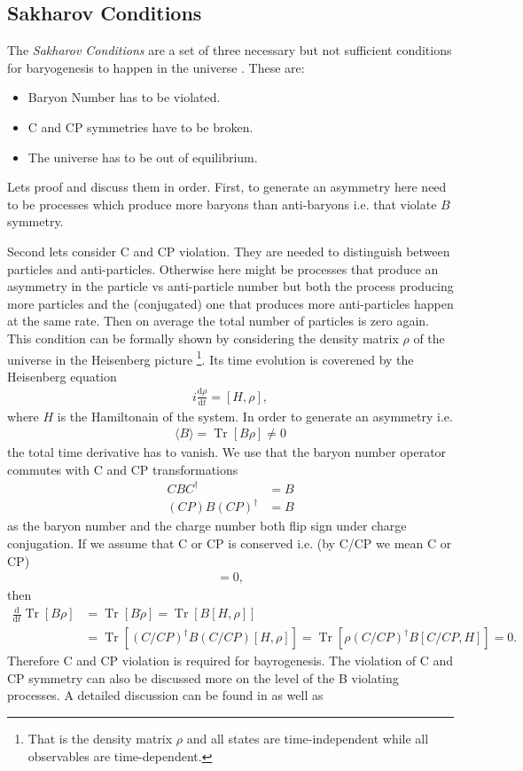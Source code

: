 \documentclass[13pt,a4paper,twoside,titlepage]{article}
\newcommand{\Tr}{\operatorname{Tr}}
\begin{document}
\subsection{Sakharov Conditions}
The \emph{Sakharov Conditions} are a set of three necessary but not sufficient conditions for baryogenesis to happen in the universe \cite{Sakharov_1991}. These are:
\begin{itemize}
    \item Baryon Number has to be violated.
    \item C and CP symmetries have to be broken.
    \item The universe has to be out of equilibrium.
\end{itemize}
Lets proof and discuss them in order.
First, to generate an asymmetry here need to be processes which produce more baryons than anti-baryons i.e. that violate $B$ symmetry.

Second lets consider C and CP violation. They are needed to distinguish between particles and anti-particles. Otherwise here might be processes that produce an asymmetry in the
particle vs anti-particle number but both the process producing more particles and the (conjugated) one that produces more anti-particles happen at the same rate.
Then on average the total number of particles is zero again.
This condition can be formally shown by considering the density matrix $\rho$ of the universe in the Heisenberg picture \footnote{That is the density matrix $\rho$ and all states are time-independent while all observables are time-dependent.}. Its time evolution is coverened by the Heisenberg equation
\begin{align}
    i \frac{\mathrm{d} \rho}{\mathrm{d} t} = [H, \rho],
\end{align}
where $H$ is the Hamiltonain of the system.
In order to generate an asymmetry i.e.
\begin{align}
    \langle B \rangle = \Tr [ B \rho ] \neq 0
\end{align}
the total time derivative has to vanish.
We use that the baryon number operator commutes with C and CP transformations
\begin{align}
    C B C^\dagger &= B \\
    (C P) B (C P)^\dagger &= B
\end{align}
as the baryon number and the charge number both flip sign under charge conjugation.
If we assume that C or CP is conserved i.e. (by C/CP we mean C or CP)
\begin{align}
[H, C/CP] = 0,
\end{align}
then
\begin{align}
    \frac{\mathrm{d}}{\mathrm{d} t} \Tr [ B \rho ] &= \Tr [ B \dot{\rho} ] = \Tr [ B [H, \rho] ] \\
    &= \Tr [ (C/CP)^\dagger B (C/CP) [H, \rho] ] = \Tr [ \rho (C/CP)^\dagger B [C/CP, H] ] = 0.
\end{align}
Therefore C and CP violation is required for bayrogenesis. The violation of C and CP symmetry can also be discussed more on the level of the B violating processes. A detailed discussion can be found in \cite[sec 2.3]{Cline:2006ts_Baryogenesis} as well as %
\end{document}

